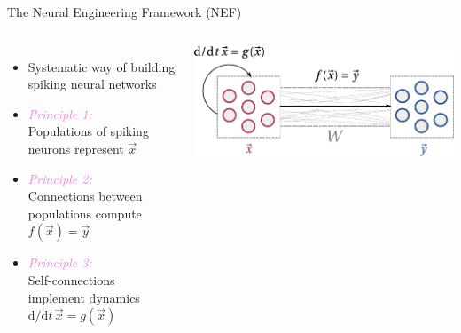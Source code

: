 \documentclass[aspectratio=169]{beamer}
\begin{document}
\begin{frame}{The Neural Engineering Framework (NEF)}
	\centering
	\begin{columns}[T]
		\begin{itemize}
			\setlength{\itemsep}{0.25cm}
			\item Systematic way of building spiking neural networks
			\item \emph{\textcolor{violet}{Principle 1:}}\\
			Populations of spiking neurons represent $\vec x$
			\item \emph{\textcolor{violet}{Principle 2:}}\\
			Connections between populations compute $f(\vec x) = \vec y$
			\item \emph{\textcolor{violet}{Principle 3:}}\\
			Self-connections implement dynamics $\mathrm{d}/\mathrm{d}t\, \vec x = g(\vec x)$
		\end{itemize}
		\centering
		\vspace{0.25cm}
		\includegraphics[scale=0.7]{media/nef_principles.pdf}
		\centering

\end{columns}
\end{frame}
\end{document}
